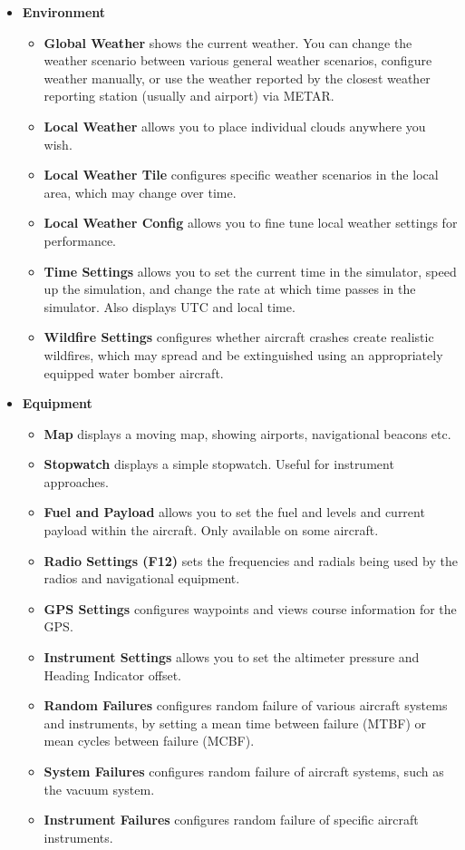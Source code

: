 \begin{itemize}
\item \textbf{Environment}
 \begin{itemize}

  \item \textbf{Global Weather} shows the current weather.
  You can change the weather scenario between various general weather scenarios,
  configure weather manually,
  or use the weather reported by the closest weather reporting station (usually
  and airport) via METAR.
  \item \textbf{Local Weather} allows you to place individual clouds anywhere you wish.
  \item \textbf{Local Weather Tile}  configures specific weather scenarios in
  the local area, which may change over time.
  \item \textbf{Local Weather Config} allows you to fine tune local weather
  settings for performance.
  \item \textbf{Time Settings} allows you to set the current
time in the simulator, speed up the simulation, and change the rate at which
time passes in the simulator. Also displays UTC and local time.
  \item \textbf{Wildfire Settings} configures whether aircraft crashes create realistic
  wildfires, which may spread and be extinguished using an appropriately equipped water
  bomber aircraft.
 \end{itemize}

\item \textbf{Equipment}
 \begin{itemize}
  \item \textbf{Map} displays a moving map, showing airports, navigational beacons etc.
  \item \textbf{Stopwatch} displays a simple stopwatch. Useful for instrument
approaches.
  \item \textbf{Fuel and Payload} allows you to
set the fuel and levels and current payload within the aircraft. Only available on
some aircraft.
  \item \textbf{Radio Settings (F12)} sets the frequencies and radials being used by
  the radios and navigational equipment.
  \item \textbf{GPS Settings}  configures waypoints and views course information for the GPS.
  \item \textbf{Instrument Settings}  allows you to set the
altimeter pressure and Heading Indicator offset.
  \item \textbf{Random Failures} configures random failure of various
aircraft systems and instruments, by setting a mean time between failure (MTBF) or mean cycles
between failure (MCBF).
  \item \textbf{System Failures} configures random failure of aircraft systems, such as the vacuum
  system.
  \item \textbf{Instrument Failures} configures random failure of specific aircraft instruments.
 \end{itemize}


\end{itemize}
